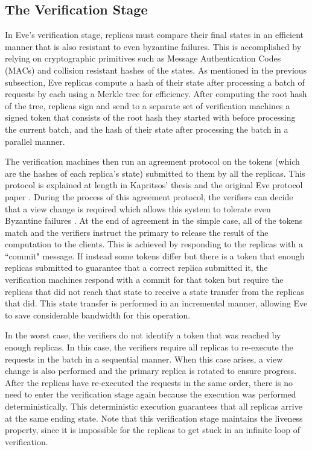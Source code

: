 \documentclass[11pt, oneside]{report}
\begin{document}
\subsection{The Verification Stage}\label{EveVerification}
In Eve's verification stage, replicas must compare their final states in an efficient manner that is also resistant to even byzantine failures. 
This is accomplished by relying on cryptographic primitives such as Message Authentication Codes (MACs) and collision resistant hashes of the states. 
As mentioned in the previous subsection, Eve replicas compute a hash of their state after processing a batch of requests by each using a Merkle tree for efficiency. 
After computing the root hash of the tree, replicas sign and send to a separate set of verification machines a signed token that consists of the root hash they started with before processing the current batch, and the hash of their state after processing the batch in a parallel manner.

The verification machines then run an agreement protocol on the tokens (which are the hashes of each replica's state) submitted to them by all the replicas. This protocol is explained at length in Kapritsos' thesis and the original Eve protocol paper \cite{eve, manosThesis}.
During the process of this agreement protocol, the verifiers can decide that a view change is required which allows this system to tolerate even Byzantine failures \cite{upRight}.
At the end of agreement in the simple case, all of the tokens  match and the verifiers instruct the primary to release the result of the computation to the clients. 
This is achieved by responding to the replicas with a ``commit" message. 
If instead some tokens differ but there is a token that enough replicas submitted to guarantee that a correct replica submitted it, the verification machines respond with a commit for that token but require the replicas that did not reach that state to receive a state transfer from the replicas that did. This state transfer is performed in an incremental manner, allowing Eve to save considerable bandwidth for this operation.

In the worst case, the verifiers do not identify a token that was reached by enough replicas. 
In this case, the verifiers require all replicas to re-execute the requests in the batch in a sequential manner. 
When this case arises, a view change is also performed and the primary replica is rotated to ensure progress.
After the replicas have re-executed the requests in the same order, there is no need to enter the verification stage again because the execution was performed deterministically. 
This deterministic execution guarantees that all replicas arrive at the same ending state.
Note that this verification stage maintains the liveness property, since it is impossible for the replicas to get stuck in an infinite loop of verification.
\end{document}
